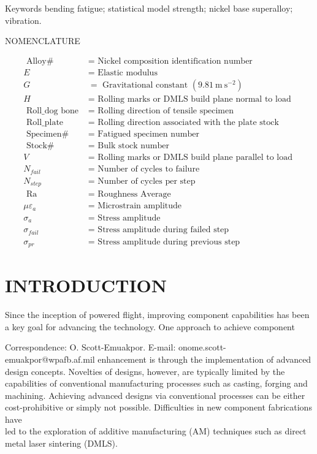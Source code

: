 \documentclass[10pt]{article}
\begin{document}
Keywords bending fatigue; statistical model strength; nickel base superalloy; vibration.

NOMENCLATURE

$$
\begin{aligned}
\text { Alloy\# } & =\text { Nickel composition identification number } \\
E & =\text { Elastic modulus } \\
G & =\text { Gravitational constant }\left(9.81 \mathrm{~m} \mathrm{~s}^{-2}\right) \\
H & =\text { Rolling marks or DMLS build plane normal to load } \\
\text { Roll_dog bone } & =\text { Rolling direction of tensile specimen } \\
\text { Roll_plate } & =\text { Rolling direction associated with the plate stock } \\
\text { Specimen\# } & =\text { Fatigued specimen number } \\
\text { Stock\# } & =\text { Bulk stock number } \\
V & =\text { Rolling marks or DMLS build plane parallel to load } \\
N_{f a i l} & =\text { Number of cycles to failure } \\
N_{s t e p} & =\text { Number of cycles per step } \\
\text { Ra } & =\text { Roughness Average } \\
\mu \varepsilon_{a} & =\text { Microstrain amplitude } \\
\sigma_{a} & =\text { Stress amplitude } \\
\sigma_{f a i l} & =\text { Stress amplitude during failed step } \\
\sigma_{p r} & =\text { Stress amplitude during previous step }
\end{aligned}
$$

\section*{INTRODUCTION}
Since the inception of powered flight, improving component capabilities has been a key goal for advancing the technology. One approach to achieve component

Correspondence: O. Scott-Emuakpor. E-mail: onome.scott-emuakpor@wpafb.af.mil enhancement is through the implementation of advanced design concepts. Novelties of designs, however, are typically limited by the capabilities of conventional manufacturing processes such as casting, forging and machining. Achieving advanced designs via conventional processes can be either cost-prohibitive or simply not possible. Difficulties in new component fabrications have\\
led to the exploration of additive manufacturing (AM) techniques such as direct metal laser sintering (DMLS).
\end{document}
